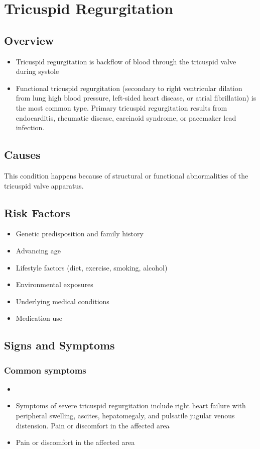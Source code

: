 \chapter{Tricuspid Regurgitation}
\label{sec:Tricuspid Regurgitation}

\section{Overview}


\begin{itemize}[noitemsep]
  \item Tricuspid regurgitation is backflow of blood through the tricuspid valve during systole
  \item Functional tricuspid regurgitation (secondary to right ventricular dilation from lung high blood pressure, left-sided heart disease, or atrial fibrillation) is the most common type. Primary tricuspid regurgitation results from endocarditis, rheumatic disease, carcinoid syndrome, or pacemaker lead infection.
\end{itemize}
\section{Causes}
This condition happens because of structural or functional abnormalities of the tricuspid valve apparatus.     
\section{Risk Factors}

\begin{itemize}[noitemsep]
  \item Genetic predisposition and family history
  \item Advancing age
  \item Lifestyle factors (diet, exercise, smoking, alcohol)
  \item Environmental exposures
  \item Underlying medical conditions
  \item Medication use
\end{itemize}
\section{Signs and Symptoms}

\subsection{Common symptoms}
\begin{itemize}[noitemsep]
  \item \item Symptoms of severe tricuspid regurgitation include right heart failure with peripheral swelling, ascites, hepatomegaly, and pulsatile jugular venous distension. Pain or discomfort in the affected area    \item Pain or discomfort in the affected area
  \end{itemize}

